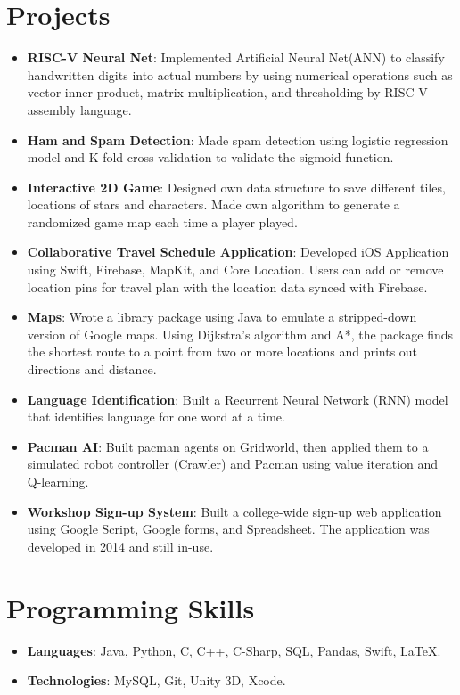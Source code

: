 \documentclass[letterpaper,11pt]{article}
\newcommand{\resumeItem}[2]{
  \item\small{
    \textbf{#1}{: #2 \vspace{-1pt}}
  }
}
\newcommand{\resumeSubItem}[2]{\resumeItem{#1}{#2}\vspace{-4pt}}
\newcommand{\resumeSubHeadingListStart}{\begin{itemize}[leftmargin=*]}
\newcommand{\resumeSubHeadingListEnd}{\end{itemize}}
\begin{document}
    

\section{Projects}
  \resumeSubHeadingListStart
    \resumeSubItem{RISC-V Neural Net}{Implemented Artificial Neural Net(ANN) to classify handwritten digits into actual numbers by using numerical operations such as vector inner product, matrix multiplication, and thresholding by RISC-V assembly language.}
    \resumeSubItem{Ham and Spam Detection}{Made spam detection using logistic regression model and K-fold cross validation to validate the sigmoid function.}
    \resumeSubItem{Interactive 2D Game}{Designed own data structure to save different tiles, locations of stars and characters. Made own algorithm to generate a randomized game map each time a player played.}
    \resumeSubItem{Collaborative Travel Schedule Application}
      {Developed iOS Application using Swift, Firebase, MapKit, and Core Location. Users can add or remove location pins for travel plan with the  location data synced with Firebase.}
    \resumeSubItem{Maps}
      {Wrote a library package using Java to emulate a stripped-down version of Google maps. Using Dijkstra’s algorithm and A*, the package finds the shortest route to a point from two or more locations and prints out directions and distance.}
    \resumeSubItem{Language Identification}
      {Built a Recurrent Neural Network (RNN) model that identifies language for one word at a time.}
    \resumeSubItem{Pacman AI}
      {Built pacman agents on Gridworld, then applied them to a simulated robot controller (Crawler) and Pacman using value iteration and Q-learning.}
    \resumeSubItem{Workshop Sign-up System}
    {Built a college-wide sign-up web application using Google Script, Google forms, and Spreadsheet. The application was developed in 2014 and still in-use.}
      \resumeSubHeadingListEnd


\section{Programming Skills}
  \resumeSubHeadingListStart
    \resumeSubItem{Languages}
    {Java, Python, C, C++, C-Sharp, SQL, Pandas, Swift, LaTeX.}
    \resumeSubItem{Technologies}
    {MySQL, Git, Unity 3D, Xcode.}
  \resumeSubHeadingListEnd


\end{document}
